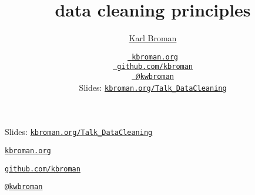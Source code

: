 \documentclass[aspectratio=169,12pt,t]{beamer}
\title{data cleaning principles}
\author{\href{https://kbroman.org}{Karl Broman}}
\institute{Biostatistics \& Medical Informatics, UW{\textendash}Madison}
\date{\href{https://kbroman.org}{\tt \scriptsize \color{foreground} kbroman.org}
\\[-4pt]
\href{https://github.com/kbroman}{\tt \scriptsize \color{foreground} github.com/kbroman}
\\[-4pt]
\href{https://twitter.com/kwbroman}{\tt \scriptsize \color{foreground} @kwbroman}
\\[-4pt]
{\scriptsize Slides: \href{https://kbroman.org/Talk_DataCleaning}{\tt kbroman.org/Talk\_DataCleaning}}
}
\begin{document}
{
\frame{
  \titlepage

\note{
}

} }


\begin{frame}[c]{}

\Large

Slides: \href{https://kbroman.org/Talk_DataCleaning}{\tt kbroman.org/Talk\_DataCleaning}

\vspace{7mm}

\href{https://kbroman.org}{\tt \lolit kbroman.org}

\vspace{7mm}

\href{https://github.com/kbroman}{\tt \lolit github.com/kbroman}

\vspace{7mm}

\href{https://twitter.com/kwbroman}{\tt \lolit @kwbroman}

\note{
}

\end{frame}
\end{document}

